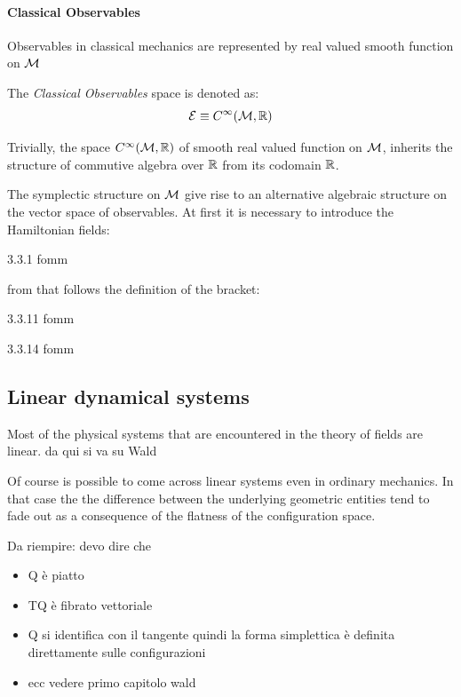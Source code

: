 \documentclass[Main]{subfiles}
\begin{document}
	\paragraph{Classical Observables}
		Observables in classical mechanics are represented by real valued smooth function on $\mathcal{M}$
	\begin{notationfix}
		The \emph{Classical Observables} space is denoted as:
		\begin{displaymath}
			\mathcal{E} \equiv		C^\infty(\mathcal{M},\mathbb{R})
		\end{displaymath}
	\end{notationfix}
	\begin{observation}
		Trivially, the space  $C^\infty(\mathcal{M},\mathbb{R})$ of smooth real valued function on $\mathcal{M}$,  inherits the structure of commutive algebra over $\mathbb{R}$ from its codomain $\mathbb{R}$.
	\end{observation}
	The symplectic structure on $\mathcal{M}$ give rise to an alternative algebraic structure on the vector space of observables.
	At first it is necessary to introduce the Hamiltonian fields:
	\begin{definition}
	3.3.1 fomm
	\end{definition}
	from that follows the definition of the bracket:
	\begin{definition}
	3.3.11 fomm
	\end{definition}	
	
	\begin{proposition}
	3.3.14 fomm
	\end{proposition}

	
	\subsection{Linear dynamical systems}	
		
	Most of the physical systems that are encountered in the theory of fields are linear.
	 da qui si va su Wald
	
	Of course is possible to come across linear systems even in ordinary mechanics. 
	In that case the the difference between the underlying geometric entities tend to fade out as a consequence of the flatness of the configuration space.
	
	\begin{Warning}
	Da riempire: devo dire che 
	\begin{itemize}
		\item Q è piatto
		\item TQ è fibrato vettoriale
		\item Q si identifica con il tangente quindi la forma simplettica è definita direttamente sulle configurazioni
		\item ecc vedere primo capitolo wald
	\end{itemize}
	\end{Warning}
\end{document}
